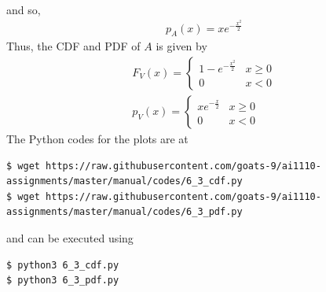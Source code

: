 \documentclass[journal,12pt,twocolumn]{IEEEtran}
\renewcommand\thesection{\arabic{section}}
\begin{document}
\begin{enumerate}[label=\thesection.\arabic*
,ref=\thesection.\theenumi]
\begin{align}
\end{align}
and so,
\begin{align}
	p_A(x) = xe^{-\frac{x^2}{2}}
\end{align}
Thus, the CDF and PDF of $A$ is given by
\begin{align}
	F_V(x) = 
	\begin{cases}
		1 - e^{-\frac{x^2}{2}} & x \geq 0 \\
		0 & x < 0 
	\end{cases} \label{eq:ral-cdf} \\
	p_V(x) = 
	\begin{cases}
		xe^{-\frac{x}{2}} & x \geq 0 \\
		0 & x < 0
	\end{cases} \label{eq:ral-pdf} 
\end{align}
The Python codes for the plots are at
\begin{lstlisting}
$ wget https://raw.githubusercontent.com/goats-9/ai1110-assignments/master/manual/codes/6_3_cdf.py
$ wget https://raw.githubusercontent.com/goats-9/ai1110-assignments/master/manual/codes/6_3_pdf.py
\end{lstlisting}
and can be executed using
\begin{lstlisting}
$ python3 6_3_cdf.py
$ python3 6_3_pdf.py
\end{lstlisting}
\end{enumerate}
\end{document}
